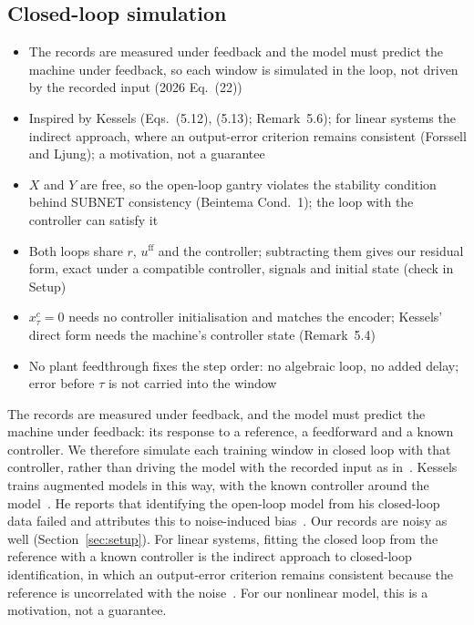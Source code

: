 \subsection{Closed-loop simulation}\label{sec:aug_loop}
\ifdraft
\begin{itemize}
\item The records are measured under feedback and the model must predict the machine under feedback, so each window is simulated in the loop, not driven by the recorded input (2026 Eq.~(22))
\item Inspired by Kessels (Eqs.~(5.12), (5.13); Remark~5.6); for linear systems the indirect approach, where an output-error criterion remains consistent (Forssell and Ljung); a motivation, not a guarantee
\item $X$ and $Y$ are free, so the open-loop gantry violates the stability condition behind SUBNET consistency (Beintema Cond.~1); the loop with the controller can satisfy it
\item Both loops share $r$, $u^{\mathrm{ff}}$ and the controller; subtracting them gives our residual form, exact under a compatible controller, signals and initial state (check in Setup)
\item $x^{c}_\tau=0$ needs no controller initialisation and matches the encoder; Kessels' direct form needs the machine's controller state (Remark~5.4)
\item No plant feedthrough fixes the step order: no algebraic loop, no added delay; error before $\tau$ is not carried into the window
\end{itemize}
\fi

The records are measured under feedback, and the model must predict the
machine under feedback: its response to a reference, a feedforward and a
known controller.
We therefore simulate each training window in closed loop with that
controller, rather than driving the model with the recorded input as
in~\cite[Eq.~(22)]{hoekstra2026lfr}.
Kessels trains augmented models in this way, with the known controller around
the model~\cite[Eqs.~(5.12), (5.13)]{kessels2025ai}.
He reports that identifying the open-loop model from his closed-loop data
failed and attributes this to noise-induced
bias~\cite[Remark~5.6]{kessels2025ai}.
Our records are noisy as well (Section~\ref{sec:setup}).
For linear systems, fitting the closed loop from the reference with a known
controller is the indirect approach to closed-loop identification, in which
an output-error criterion remains consistent because the reference is
uncorrelated with the noise~\cite{forssell1999revisited}.
For our nonlinear model, this is a motivation, not a guarantee.

